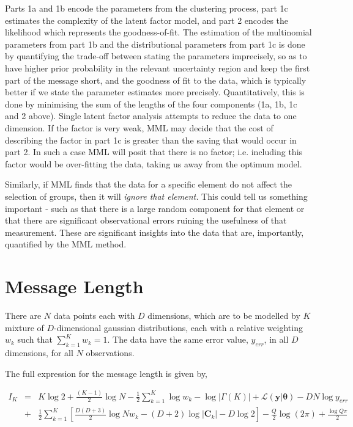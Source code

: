 \documentclass{elsarticle}
\newcommand{\vect}[1]{\boldsymbol{\mathbf{#1}}}
\def\veccov{\vect{C}}
\def\vectheta{\vect{\theta}}
\def\weight{w}
\def\datum{y}
\def\data{\vect{\datum}}
\begin{document}
\vspace{-1mm}

Parts 1a and 1b encode the parameters from the clustering process, part 1c  
estimates the complexity of the latent factor model, and part 2 encodes the likelihood 
which represents the goodness-of-fit. 
The estimation of the multinomial parameters from part 1b and the distributional parameters 
from part 1c is done by quantifying the trade-off between stating the parameters imprecisely, 
so as to have higher prior probability in the relevant uncertainty region and keep the first 
part of the message short, and the goodness of fit to the data, which is typically better 
if we state the parameter estimates more precisely. Quantitatively, this is done by 
minimising the sum of the lengths of the four components (1a, 1b, 1c and 2 above).
Single latent factor analysis attempts to reduce the data to one dimension. 
If the factor is very weak,  MML may decide that the cost 
of describing the factor in part 1c is greater than the saving that would occur 
in part 2. In such a case MML will 
posit that there is no factor; i.e. including this factor would be over-fitting 
the data, taking us away from the optimum model.


Similarly, if MML finds that 
the data for a specific element do not affect the selection %
of groups, then it will {\it ignore that element.\/} This could tell us something 
important - such as that there is a large random component for that element 
or that there are significant observational 
errors ruining the usefulness of that measurement. 
These are significant insights into the data that are, importantly, quantified by the MML method.


\section{Message Length}
There are $N$ data points each with $D$ dimensions, which are to be modelled
by $K$ mixture of $D$-dimensional gaussian distributions, each with a relative
weighting $\weight_k$ such that $\sum_{k=1}^{K}\weight_k = 1$. 
The data have the same error value, $y_{err}$, in all $D$ dimensions, for all $N$ observations.

The full expression for the message length is
given by,

\begin{eqnarray}
I_K & = & K\log{2} %
    + \frac{(K - 1)}{2}\log{N} - \frac{1}{2}\sum_{k=1}^{K}\log{w_k} - \log{|\Gamma(K)|} %
    + \mathcal{L}(\data|\vectheta) - DN\log{y_{err}} \\ %
  & + & \frac{1}{2}\sum_{k=1}^{K}\left[\frac{D(D+3)}{2}\log{{Nw_k}} - (D + 2)\log{|\veccov_k|} - D\log{2}\right] %
    - \frac{Q}{2}\log(2\pi) + \frac{\log{Q\pi}}{2} %
\end{eqnarray}
\end{document}
